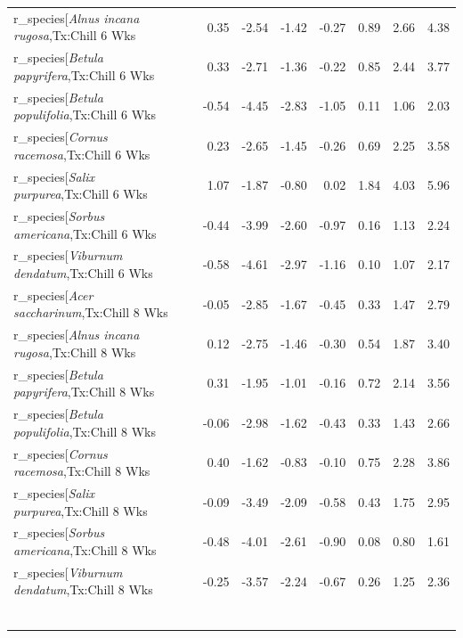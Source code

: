 \documentclass{article}\usepackage[]{graphicx}\usepackage[]{color}
\begin{document}
\begin{longtable}{lrrrrrrr}
  r_species[\textit{Alnus incana rugosa},Tx:Chill 6 Wks & 0.35 & -2.54 & -1.42 & -0.27 & 0.89 & 2.66 & 4.38 \\ 
  r_species[\textit{Betula papyrifera},Tx:Chill 6 Wks & 0.33 & -2.71 & -1.36 & -0.22 & 0.85 & 2.44 & 3.77 \\ 
  r_species[\textit{Betula populifolia},Tx:Chill 6 Wks & -0.54 & -4.45 & -2.83 & -1.05 & 0.11 & 1.06 & 2.03 \\ 
  r_species[\textit{Cornus racemosa},Tx:Chill 6 Wks & 0.23 & -2.65 & -1.45 & -0.26 & 0.69 & 2.25 & 3.58 \\ 
  r_species[\textit{Salix purpurea},Tx:Chill 6 Wks & 1.07 & -1.87 & -0.80 & 0.02 & 1.84 & 4.03 & 5.96 \\ 
  r_species[\textit{Sorbus americana},Tx:Chill 6 Wks & -0.44 & -3.99 & -2.60 & -0.97 & 0.16 & 1.13 & 2.24 \\ 
  r_species[\textit{Viburnum dendatum},Tx:Chill 6 Wks & -0.58 & -4.61 & -2.97 & -1.16 & 0.10 & 1.07 & 2.17 \\ 
  r_species[\textit{Acer saccharinum},Tx:Chill 8 Wks & -0.05 & -2.85 & -1.67 & -0.45 & 0.33 & 1.47 & 2.79 \\ 
  r_species[\textit{Alnus incana rugosa},Tx:Chill 8 Wks & 0.12 & -2.75 & -1.46 & -0.30 & 0.54 & 1.87 & 3.40 \\ 
  r_species[\textit{Betula papyrifera},Tx:Chill 8 Wks & 0.31 & -1.95 & -1.01 & -0.16 & 0.72 & 2.14 & 3.56 \\ 
  r_species[\textit{Betula populifolia},Tx:Chill 8 Wks & -0.06 & -2.98 & -1.62 & -0.43 & 0.33 & 1.43 & 2.66 \\ 
  r_species[\textit{Cornus racemosa},Tx:Chill 8 Wks & 0.40 & -1.62 & -0.83 & -0.10 & 0.75 & 2.28 & 3.86 \\ 
  r_species[\textit{Salix purpurea},Tx:Chill 8 Wks & -0.09 & -3.49 & -2.09 & -0.58 & 0.43 & 1.75 & 2.95 \\ 
  r_species[\textit{Sorbus americana},Tx:Chill 8 Wks & -0.48 & -4.01 & -2.61 & -0.90 & 0.08 & 0.80 & 1.61 \\ 
  r_species[\textit{Viburnum dendatum},Tx:Chill 8 Wks & -0.25 & -3.57 & -2.24 & -0.67 & 0.26 & 1.25 & 2.36 \\ 
   &  &  &  &  &  &  &  \\ 
   &  &  &  &  &  &  &  \\ 
   &  &  &  &  &  &  &  \\ 
   &  &  &  &  &  &  &  \\ 
   &  &  &  &  &  &  &  \\ 
   &  &  &  &  &  &  &  \\ 

\end{longtable}
\end{document}

